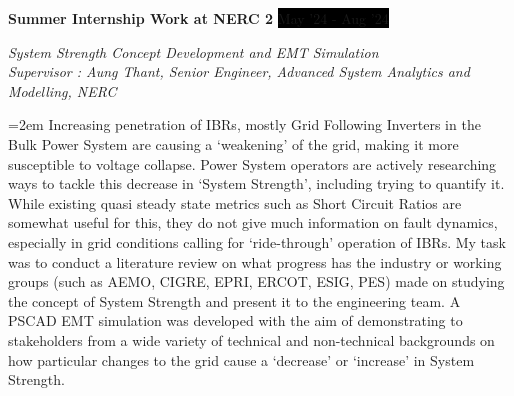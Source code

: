 \documentclass[paper=a4,fontsize=11pt]{scrartcl} %
\newcommand{\sepspace}{\vspace*{1em}}		%
\newcommand{\EducationEntry}[4]{
		\noindent \textbf{#1} \hfill      %
		\colorbox{Black}{%
			\parbox{10em}{%
			\hfill\color{White}#2}} \par  %
		\noindent \textit{#3} \par        %
		\noindent\hangindent=2em\hangafter=0 \small #4 %
		\normalsize \par}
\newcommand{\WorkEntry}[4]{				  %
		\noindent \textbf{#1} \hfill      %
		\colorbox{Black}{\color{White}#2} \par  %
		\noindent \textit{#3} \par              %
		\noindent\hangindent=2em\hangafter=0 \small #4 %
		\normalsize \par}
\begin{document}
\sepspace 

\WorkEntry{Summer Internship Work at NERC 2}{May '24 - Aug '24}{System Strength Concept Development and EMT Simulation\\ Supervisor : Aung Thant, Senior Engineer, Advanced System Analytics and Modelling, NERC}
{Increasing penetration of IBRs, mostly Grid Following Inverters in the Bulk Power System are causing a `weakening' of the grid, making it more susceptible to voltage collapse. Power System operators are actively researching ways to tackle this decrease in `System Strength', including trying to quantify it. While existing quasi steady state metrics such as Short Circuit Ratios are somewhat useful for this, they do not give much information on fault dynamics, especially in grid conditions calling for `ride-through' operation of IBRs. My task was to conduct a literature review on what progress has the industry or working groups (such as AEMO, CIGRE, EPRI, ERCOT, ESIG, PES) made on studying the concept of System Strength and present it to the engineering team. A PSCAD EMT simulation was developed with the aim of demonstrating to stakeholders from a wide variety of technical and non-technical backgrounds on how particular changes to the grid cause a `decrease' or `increase' in System Strength.}



\end{document}
